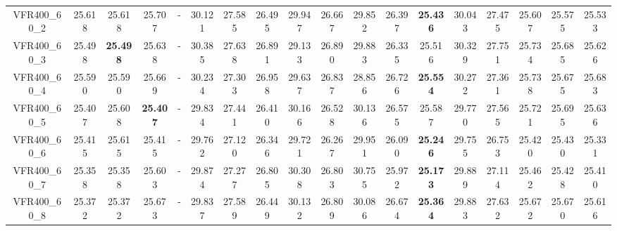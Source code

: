 \begin{tabular}{cc|ccc|ccccccccccccc}
VFR400\_60\_2      & 25.618           & 25.618           & 25.707           & -                & 30.121           & 27.585           & 26.495           & 29.947           & 26.667           & 29.852           & 26.397           & {\bf 25.436}     & 30.043           & 27.475           & 25.607           & 25.575           & 25.533          \\ 
VFR400\_60\_3      & 25.498           & {\bf 25.498}     & 25.638           & -                & 30.385           & 27.638           & 26.891           & 29.133           & 26.890           & 29.883           & 26.335           & 25.516           & 30.329           & 27.751           & 25.734           & 25.685           & 25.626          \\ 
VFR400\_60\_4      & 25.590           & 25.590           & 25.669           & -                & 30.234           & 27.303           & 26.958           & 29.637           & 26.837           & 28.856           & 26.726           & {\bf 25.554}     & 30.272           & 27.361           & 25.738           & 25.675           & 25.683          \\ 
VFR400\_60\_5      & 25.407           & 25.608           & {\bf 25.407}     & -                & 29.834           & 27.441           & 26.410           & 30.166           & 26.528           & 30.136           & 26.575           & 25.587           & 29.770           & 27.565           & 25.721           & 25.695           & 25.636          \\ 
VFR400\_60\_6      & 25.415           & 25.615           & 25.415           & -                & 29.762           & 27.120           & 26.346           & 29.721           & 26.267           & 29.951           & 26.090           & {\bf 25.246}     & 29.755           & 26.753           & 25.420           & 25.430           & 25.331          \\ 
VFR400\_60\_7      & 25.358           & 25.358           & 25.603           & -                & 29.874           & 27.277           & 26.805           & 30.308           & 26.803           & 30.755           & 25.972           & {\bf 25.173}     & 29.889           & 27.114           & 25.462           & 25.428           & 25.410          \\ 
VFR400\_60\_8      & 25.372           & 25.372           & 25.673           & -                & 29.837           & 27.589           & 26.449           & 30.132           & 26.809           & 30.086           & 26.674           & {\bf 25.364}     & 29.883           & 27.632           & 25.672           & 25.670           & 25.616          \\ 

\end{tabular}
